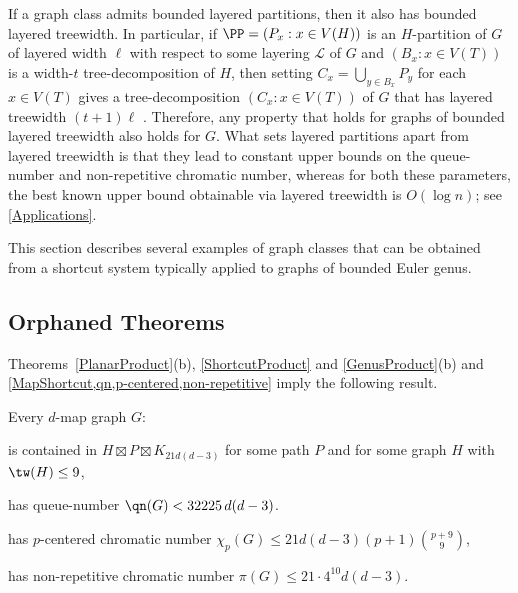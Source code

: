  If a graph class admits bounded layered partitions, then it also has bounded layered treewidth. In particular, if $\PP=(P_x:x\in V(H))$ is an $H$-partition of $G$ of layered width $\ell$ with respect to some layering $\mathcal{L}$ of $G$ and $(B_x:x\in V(T))$ is a width-$t$ tree-decomposition of $H$, then setting $C_x = \bigcup_{y\in B_x} P_y$ for each $x\in V(T)$ gives a tree-decomposition $(C_x:x\in V(T))$ of $G$ that has layered treewidth $(t+1)\ell$ \cite{DJMMUW20}. Therefore, any property that holds for graphs of bounded layered treewidth also holds for $G$. What sets layered partitions apart from layered treewidth is that they lead to constant upper bounds on the queue-number  and non-repetitive chromatic number, whereas for both these parameters, the best known upper bound obtainable via layered treewidth is $O(\log n)$; see \cref{Applications}.



 \label{sec-k-planar}







 This section describes several examples of graph classes that can be obtained from a shortcut system typically applied to graphs of bounded Euler genus.

 \subsection{Orphaned Theorems}

 Theorems~\ref{PlanarProduct}(b),  \ref{ShortcutProduct} and  \ref{GenusProduct}(b) and \cref{MapShortcut,qn,p-centered,non-repetitive} imply the following result.

 \begin{thm}
 \label{PlaneMapPartition}
 Every $d$-map graph $G$:
 	\begin{compactitem}
 		\item is contained in $H \boxtimes P \boxtimes K_{21d(d-3)}$ for some path $P$ and for some graph $H$ with $\tw(H)\leq 9$,
 		\item has queue-number $\qn(G) < 32225\, d(d-3)$.
 		\item has $p$-centered chromatic number $\chi_p(G) \leq 21d(d-3) (p+1)  \binom{p+9}{9}$,
 		\item has non-repetitive chromatic number $ \pi(G) \leq 21 \cdot 4^{10} d(d-3)$.
 	\end{compactitem}
 \end{thm}

